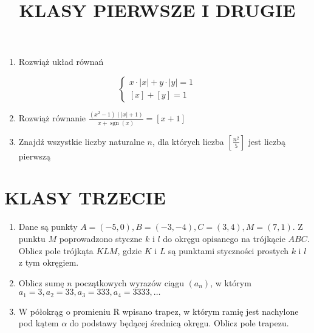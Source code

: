 \documentclass[10pt]{article}
\title{KLASY PIERWSZE I DRUGIE }
\author{}
\date{}
\begin{document}
\maketitle
\begin{enumerate}
  \item Rozwiąż układ równań
\end{enumerate}

\[
\left\{\begin{array}{c}
x \cdot|x|+y \cdot|y|=1 \\
{[x]+[y]=1}
\end{array}\right.
\]

\begin{enumerate}
  \setcounter{enumi}{1}
  \item Rozwiąż równanie \(\frac{\left(x^{2}-1\right)(|x|+1)}{x+\operatorname{sgn}(x)}=[x+1]\)
  \item Znajdź wszystkie liczby naturalne \(n\), dla których liczba \(\left[\frac{n^{2}}{5}\right]\) jest liczbą pierwszą
\end{enumerate}

\section*{KLASY TRZECIE}
\begin{enumerate}
  \item Dane są punkty \(A=(-5,0), B=(-3,-4), C=(3,4), M=(7,1)\). Z punktu \(M\) poprowadzono styczne \(k\) i \(l\) do okręgu opisanego na trójkącie \(A B C\). Oblicz pole trójkąta \(K L M\), gdzie \(K\) i \(L\) są punktami styczności prostych \(k\) i \(l\) z tym okręgiem.
  \item Oblicz sumę \(n\) początkowych wyrazów ciągu \(\left(a_{n}\right)\), w którym \(a_{1}=3, a_{2}=33, a_{3}=333, a_{4}=3333, \ldots\)
  \item W półokrąg o promieniu R wpisano trapez, w którym ramię jest nachylone pod kątem \(\alpha\) do podstawy będącej średnicą okręgu. Oblicz pole trapezu.
\end{enumerate}
\end{document}
